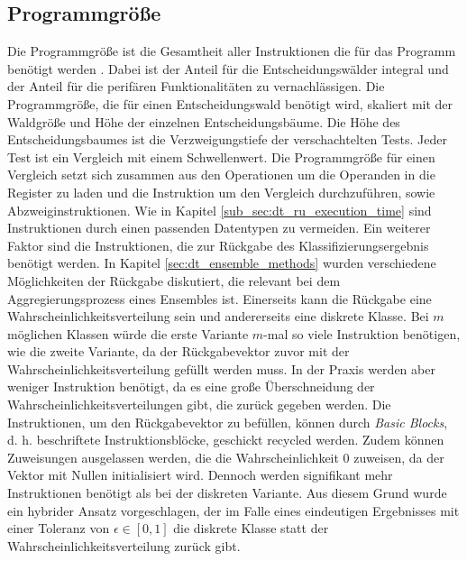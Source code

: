 \newpage
\subsection{Programmgröße}
\label{sub_sec:dt_ru_programm_size}
Die Programmgröße ist die Gesamtheit aller Instruktionen die für das Programm benötigt werden \cite{dymelThesis}.
Dabei ist der Anteil für die Entscheidungswälder integral und der Anteil für die perifären Funktionalitäten zu vernachlässigen.
Die Programmgröße, die für einen Entscheidungswald benötigt wird, skaliert mit der Waldgröße und Höhe der einzelnen Entscheidungsbäume.
\newline
\newline
Die Höhe des Entscheidungsbaumes ist die Verzweigungstiefe der verschachtelten Tests.
Jeder Test ist ein Vergleich mit einem Schwellenwert.
Die Programmgröße für einen Vergleich setzt sich zusammen aus den Operationen um die Operanden in die Register zu laden
und die Instruktion um den Vergleich durchzuführen, sowie Abzweiginstruktionen. Wie in Kapitel \ref{sub_sec:dt_ru_execution_time}
sind Instruktionen durch einen passenden Datentypen zu vermeiden.
\newline
\newline
Ein weiterer Faktor sind die Instruktionen, die zur Rückgabe des Klassifizierungsergebnis benötigt werden.
In Kapitel \ref{sec:dt_ensemble_methods} wurden verschiedene Möglichkeiten der Rückgabe diskutiert, die relevant bei dem Aggregierungsprozess eines Ensembles ist.
Einerseits kann die Rückgabe eine Wahrscheinlichkeitsverteilung sein und andererseits eine diskrete Klasse.
Bei $m$ möglichen Klassen würde die erste Variante $m$-mal so viele Instruktion benötigen, wie die zweite Variante, da der Rückgabevektor zuvor mit der Wahrscheinlichkeitsverteilung gefüllt werden muss.
In der Praxis werden aber weniger Instruktion benötigt, da es eine große Überschneidung der Wahrscheinlichkeitsverteilungen gibt, die zurück gegeben werden.
Die Instruktionen, um den Rückgabevektor zu befüllen, können durch \textit{Basic Blocks}, d. h. beschriftete Instruktionsblöcke, geschickt recycled werden.
Zudem können Zuweisungen ausgelassen werden, die die Wahrscheinlichkeit 0 zuweisen, da der Vektor mit Nullen initialisiert wird.
Dennoch werden signifikant mehr Instruktionen benötigt als bei der diskreten Variante.
Aus diesem Grund wurde ein hybrider Ansatz vorgeschlagen, der im Falle eines eindeutigen Ergebnisses mit einer Toleranz von $\epsilon\in [0, 1]$ die diskrete Klasse statt der Wahrscheinlichkeitsverteilung zurück gibt.